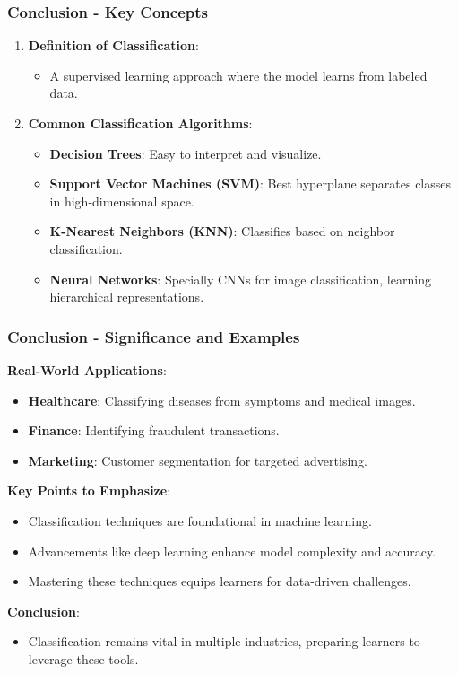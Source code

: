 \documentclass[aspectratio=169]{beamer}
\begin{document}
\begin{frame}[fragile]
    \frametitle{Conclusion - Key Concepts}
    \begin{enumerate}
        \item \textbf{Definition of Classification}:
        \begin{itemize}
            \item A supervised learning approach where the model learns from labeled data.
        \end{itemize}
        
        \item \textbf{Common Classification Algorithms}:
        \begin{itemize}
            \item \textbf{Decision Trees}: Easy to interpret and visualize.
            \item \textbf{Support Vector Machines (SVM)}: Best hyperplane separates classes in high-dimensional space.
            \item \textbf{K-Nearest Neighbors (KNN)}: Classifies based on neighbor classification.
            \item \textbf{Neural Networks}: Specially CNNs for image classification, learning hierarchical representations.
        \end{itemize}
    \end{enumerate}
\end{frame}

\begin{frame}[fragile]
    \frametitle{Conclusion - Significance and Examples}
    \textbf{Real-World Applications}:
    \begin{itemize}
        \item \textbf{Healthcare}: Classifying diseases from symptoms and medical images.
        \item \textbf{Finance}: Identifying fraudulent transactions.
        \item \textbf{Marketing}: Customer segmentation for targeted advertising.
    \end{itemize}
    
    \textbf{Key Points to Emphasize}:
    \begin{itemize}
        \item Classification techniques are foundational in machine learning.
        \item Advancements like deep learning enhance model complexity and accuracy.
        \item Mastering these techniques equips learners for data-driven challenges.
    \end{itemize}
    
    \textbf{Conclusion}:
    \begin{itemize}
        \item Classification remains vital in multiple industries, preparing learners to leverage these tools.
    \end{itemize}
\end{frame}
\end{document}
